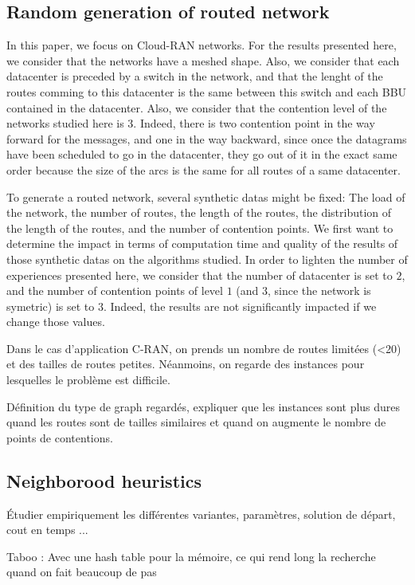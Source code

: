 \documentclass[english]{article}
\begin{document}
\subsection{Random generation of routed network}
In this paper, we focus on Cloud-RAN networks. For the results presented here, we consider that the networks have a meshed shape. Also, we consider that each datacenter is preceded by a switch in the network, and that the lenght of the routes comming to this datacenter is the same between this switch and each BBU contained in the datacenter.
Also, we consider that the contention level of the networks studied here is $3$. Indeed, there is two contention point in the way forward for the messages, and one in the way backward, since once the datagrams have been scheduled to go in the datacenter, they go out of it in the exact same order because the size of the arcs is the same for all routes of a same datacenter.

To generate a routed network, several synthetic datas might be fixed: The load of the network, the number of routes, the length of the routes, the distribution of the length of the routes, and the number of contention points.  We first want to determine the impact in terms of computation time and quality of the results of those synthetic datas on the algorithms studied.
In order to lighten the number of experiences presented here, we consider that the number of datacenter is set to $2$, and the number of contention points of level $1$ (and $3$, since the network is symetric) is set to $3$. Indeed, the results are not significantly impacted if we change those values. 

Dans le cas d'application C-RAN, on prends un nombre de routes limitées (<20) et des tailles de routes petites. Néanmoins, on regarde des instances pour lesquelles le problème est difficile.\

Définition du type de graph regardés, expliquer que les instances sont plus dures quand les routes sont de tailles similaires et quand on augmente le nombre de points de contentions.\\

\subsection{Neighborood heuristics}

Étudier empiriquement les différentes variantes, paramètres, solution de départ, cout en temps ...


Taboo : Avec une hash table pour la mémoire, ce qui rend long la recherche quand on fait beaucoup de pas\\
\end{document}
